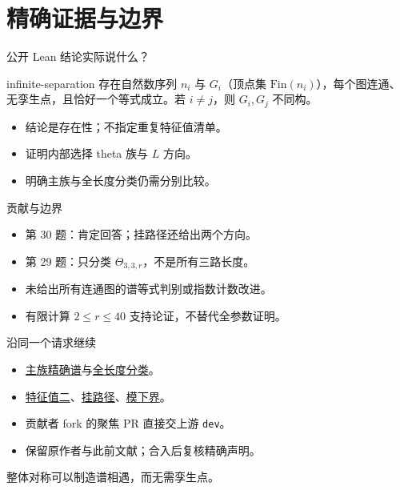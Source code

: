 \documentclass{beamer}
\begin{document}
\section{精确证据与边界}
\begin{frame}{公开 Lean 结论实际说什么？}
\begin{bookresult}{infinite-separation}
存在自然数序列 $n_i$ 与 $G_i$（顶点集 $\mathrm{Fin}(n_i)$），每个图连通、无孪生点，且恰好一个等式成立。若 $i\ne j$，则 $G_i,G_j$ 不同构。
\end{bookresult}
\begin{itemize}
\item 结论是存在性；不指定重复特征值清单。
\item 证明内部选择 theta 族与 $L$ 方向。
\item 明确主族与全长度分类仍需分别比较。
\end{itemize}
\end{frame}
\begin{frame}{贡献与边界}
\begin{itemize}
\item 第 30 题：肯定回答；挂路径还给出两个方向。
\item 第 29 题：只分类 $\Theta_{3,3,r}$，不是所有三路长度。
\item 未给出所有连通图的谱等式判别或指数计数改进。
\item 有限计算 $2\leq r\leq40$ 支持论证，不替代全参数证明。
\end{itemize}
\end{frame}
\begin{frame}{沿同一个请求继续}
\begin{itemize}
\item \href{https://github.com/the-omega-institute/trureturing-requests/issues/39}{主族精确谱}与\href{https://github.com/the-omega-institute/trureturing-requests/issues/40}{全长度分类}。
\item \href{https://github.com/the-omega-institute/trureturing-requests/issues/41}{特征值二}、\href{https://github.com/the-omega-institute/trureturing-requests/issues/42}{挂路径}、\href{https://github.com/the-omega-institute/trureturing-requests/issues/43}{模下界}。
\item 贡献者 fork 的聚焦 PR 直接交上游 \texttt{dev}。
\item 保留原作者与此前文献；合入后复核精确声明。
\end{itemize}
整体对称可以制造谱相遇，而无需孪生点。
\end{frame}
\appendix
\end{document}
